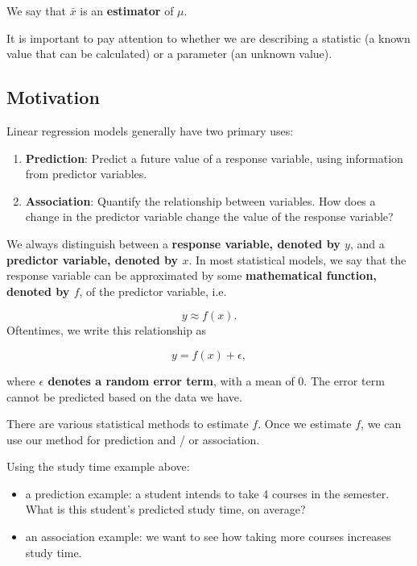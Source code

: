 \documentclass[
]{book}
\providecommand{\tightlist}{%
  \setlength{\itemsep}{0pt}\setlength{\parskip}{0pt}}
\begin{document}
We say that \(\bar{x}\) is an \textbf{estimator} of \(\mu\).

It is important to pay attention to whether we are describing a statistic (a known value that can be calculated) or a parameter (an unknown value).

\subsection{Motivation}\label{motivation}

Linear regression models generally have two primary uses:

\begin{enumerate}
\def\labelenumi{\arabic{enumi}.}
\tightlist
\item
  \textbf{Prediction}: Predict a future value of a response variable, using information from predictor variables.
\item
  \textbf{Association}: Quantify the relationship between variables. How does a change in the predictor variable change the value of the response variable?
\end{enumerate}

We always distinguish between a \textbf{response variable, denoted by \(y\)}, and a \textbf{predictor variable, denoted by \(x\)}. In most statistical models, we say that the response variable can be approximated by some \textbf{mathematical function, denoted by \(f\)}, of the predictor variable, i.e.

\[
y \approx f(x).
\]
Oftentimes, we write this relationship as

\[
y = f(x) + \epsilon,
\]

where \textbf{\(\epsilon\) denotes a random error term}, with a mean of 0. The error term cannot be predicted based on the data we have.

There are various statistical methods to estimate \(f\). Once we estimate \(f\), we can use our method for prediction and / or association.

Using the study time example above:

\begin{itemize}
\tightlist
\item
  a prediction example: a student intends to take 4 courses in the semester. What is this student's predicted study time, on average?
\item
  an association example: we want to see how taking more courses increases study time.
\end{itemize}
\end{document}
